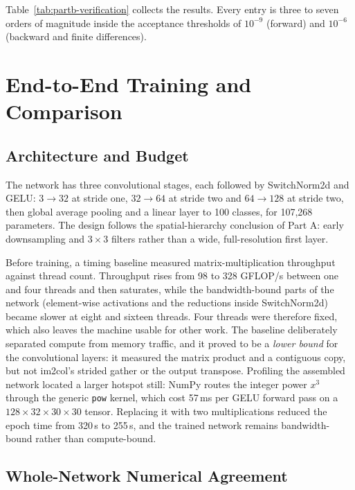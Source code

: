 Table~\ref{tab:partb-verification} collects the results. Every entry is three to seven orders of
magnitude inside the acceptance thresholds of $10^{-9}$ (forward) and $10^{-6}$ (backward and finite
differences).

\section{End-to-End Training and Comparison}
\label{sec:partb-training}

\subsection{Architecture and Budget}

The network has three convolutional stages, each followed by SwitchNorm2d and GELU:
$3\!\to\!32$ at stride one, $32\!\to\!64$ at stride two and $64\!\to\!128$ at stride two, then global
average pooling and a linear layer to 100 classes, for 107{,}268 parameters. The design follows the
spatial-hierarchy conclusion of Part A: early downsampling and $3\times3$ filters rather than a wide,
full-resolution first layer.

Before training, a timing baseline measured matrix-multiplication throughput against thread count.
Throughput rises from 98 to 328 GFLOP/s between one and four threads and then saturates, while the
bandwidth-bound parts of the network (element-wise activations and the reductions inside
SwitchNorm2d) became slower at eight and sixteen threads. Four threads were therefore fixed, which
also leaves the machine usable for other work. The baseline deliberately separated compute from
memory traffic, and it proved to be a \emph{lower bound} for the convolutional layers: it measured
the matrix product and a contiguous copy, but not im2col's strided gather or the output transpose.
Profiling the assembled network located a larger hotspot still: NumPy routes the integer power
$x^3$ through the generic \texttt{pow} kernel, which cost 57\,ms per GELU forward pass on a
$128\times32\times30\times30$ tensor. Replacing it with two multiplications reduced the epoch time
from 320\,s to 255\,s, and the trained network remains bandwidth-bound rather than compute-bound.

\subsection{Whole-Network Numerical Agreement}


